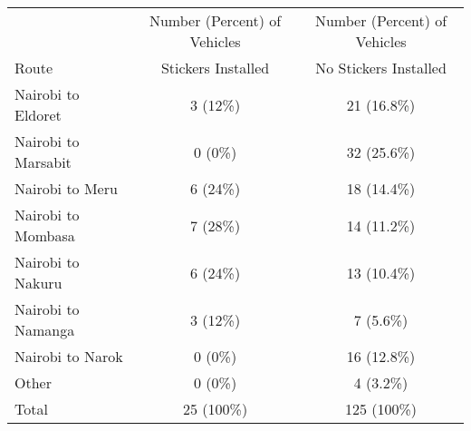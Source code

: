 \begin{tabular}{lcc} 
\hline 
      & Number (Percent) of Vehicles         & Number (Percent) of Vehicles \\ 
Route & Stickers Installed & No Stickers Installed \\ 
\hline 
Nairobi to Eldoret & 3 (12\%) & 21 (16.8\%) \\ 
 Nairobi to Marsabit & 0 (0\%) & 32 (25.6\%) \\ 
 Nairobi to Meru & 6 (24\%) & 18 (14.4\%) \\ 
 Nairobi to Mombasa & 7 (28\%) & 14 (11.2\%) \\ 
 Nairobi to Nakuru & 6 (24\%) & 13 (10.4\%) \\ 
 Nairobi to Namanga & 3 (12\%) & 7 (5.6\%) \\ 
 Nairobi to Narok & 0 (0\%) & 16 (12.8\%) \\ 
 Other & 0 (0\%) & 4 (3.2\%) \\ 
\hline 
Total & 25 (100\%) & 125 (100\%) \\ 
\hline 
\end{tabular}